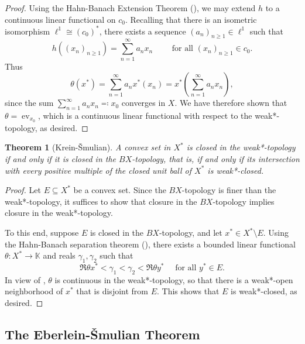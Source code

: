 \documentclass[11pt]{article}
\theoremstyle{thmstyle}
\newtheorem{theorem}{Theorem}[section]
\theoremstyle{defstyle}
\newcommand{\R}{\mathbb{R}}
\newcommand{\bbC}{\mathbb{C}}
\newcommand{\K}{\mathbb{K}} %
\newcommand{\ev}{\operatorname{ev}}
\renewcommand{\ge}{\geqslant}
\begin{document}
\begin{proof}
    Using the Hahn-Banach Extension Theorem (), we may extend $h$ to a continuous linear functional on $c_0$. Recalling that there is an isometric isomorphism $\ell^1\cong\left(c_0\right)^\ast$, there exists a sequence $(a_n)_{n\ge 1}\in\ell^1$ such that 
    \begin{equation*}
        h\left((x_n)_{n\ge 1}\right) = \sum_{n = 1}^\infty a_n x_n\qquad\text{ for all }\left(x_n\right)_{n\ge 1}\in c_0.
    \end{equation*}
    Thus 
    \begin{equation*}
        \theta(x^\ast) = \sum_{n = 1}^\infty a_n x^\ast(x_n) = x^\ast\left(\sum_{n = 1}^\infty a_n x_n\right),
    \end{equation*}
    since the sum $\displaystyle\sum_{n = 1}^\infty a_nx_n\eqcolon x_0$ converges in $X$. We have therefore shown that $\theta = \ev_{x_0}$, which is a continuous linear functional with respect to the weak*-topology, as desired.
\end{proof}

\begin{theorem}[Krein-\v{S}mulian]
    A convex set in $X^\ast$ is closed in the weak*-topology if and only if it is closed in the $BX$-topology, that is, if and only if its intersection with every positive multiple of the closed unit ball of $X^\ast$ is weak*-closed.
\end{theorem}
\begin{proof}
    Let $E\subseteq X^\ast$ be a convex set. Since the $BX$-topology is finer than the weak*-topology, it suffices to show that closure in the $BX$-topology implies closure in the weak*-topology. 

    To this end, suppose $E$ is closed in the $BX$-topology, and let $x^\ast\in X^\ast\setminus E$. Using the Hahn-Banach separation theorem (), there exists a bounded linear functional $\theta\colon X^\ast\to\K$ and reals $\gamma_1,\gamma_2$ such that 
    \begin{equation*}
        \Re\theta x^\ast < \gamma_1 < \gamma_2 < \Re\theta y^\ast\quad\text{ for all }y^\ast\in E.
    \end{equation*}
    In view of , $\theta$ is continuous in the weak*-topology, so that there is a weak*-open neighborhood of $x^\ast$ that is disjoint from $E$. This shows that $E$ is weak*-closed, as desired.
\end{proof}

\subsection{The Eberlein-\v{S}mulian Theorem}
\end{document}
